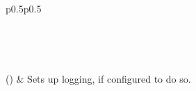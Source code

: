 \documentclass[letterpaper,10pt,english]{sphinxmanual}
\begin{document}
\begin{savenotes}\sphinxatlongtablestart\begin{longtable}[c]{p{0.5\linewidth}p{0.5\linewidth}}
\hline

\endfirsthead

%
{}\\
\hline

\endhead

\hline
{}\\
\endfoot

\endlastfoot

{\hyperref[\detokenize{autoapi/pine/client/index:pine.client.setup_logging}]{}}()
&
Sets up logging, if configured to do so.
\\
\hline
\end{longtable}\sphinxatlongtableend\end{savenotes}
\end{document}
